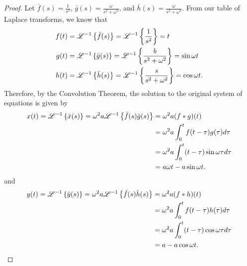 \begin{proof}
  Let $\bar{f}(s) = \frac{1}{s^2}$, $\bar{g}(s) = \frac{\omega}{s^2 + \omega^2}$, and $\bar{h}(s) = \frac{\omega}{s^2 + \omega^2}$.
  From our table of Laplace transforms, we know that
  \begin{align*}
    f(t) &= \mathscr{L}^{-1}\left\{ {\bar{f}(s)} \right\} = \mathscr{L}^{-1}\left\{ {\frac{1}{s^2}} \right\} = t \\
    g(t) &= \mathscr{L}^{-1}\left\{ {\bar{g}(s)} \right\} = \mathscr{L}^{-1}\left\{ {\frac{b}{s^2 + \omega^2}} \right\} = \sin \omega t \\
    h(t) &= \mathscr{L}^{-1}\left\{ {\bar{h}(s)} \right\} = \mathscr{L}^{-1}\left\{ {\frac{s}{s^2 + \omega^2}} \right\} = \cos \omega t.
  \end{align*}
  Therefore, by the Convolution Theorem, the solution to the original system of equations is given by
  \begin{align*}
    x(t) = \mathscr{L}^{-1}\left\{ {\bar{x}(s)} \right\} = \omega^2 a \mathscr{L}^{-1}\left\{ {\bar{f}(s)\bar{g}(s)} \right\} &= \omega^2 a (f \ast g)(t) \\
    &= \omega^2 a \int_0^t f(t-\tau)g(\tau) d\tau \\
    &= \omega^2 a \int_0^t (t-\tau)\sin \omega \tau d\tau \\
    &= a\omega t - a \sin \omega t.
  \end{align*}
  and
  \begin{align*}
    y(t) = \mathscr{L}^{-1}\left\{ {\bar{y}(s)} \right\} = \omega^2 a \mathscr{L}^{-1}\left\{ {\bar{f}(s)\bar{h}(s)} \right\} &= \omega^2 a (f \ast h)(t) \\
    &= \omega^2 a \int_0^t f(t-\tau)h(\tau) d\tau \\
    &= \omega^2 a \int_0^t (t-\tau)\cos \omega \tau d\tau \\
    &= a - a \cos \omega t.
  \end{align*}

\end{proof}
\newpage
